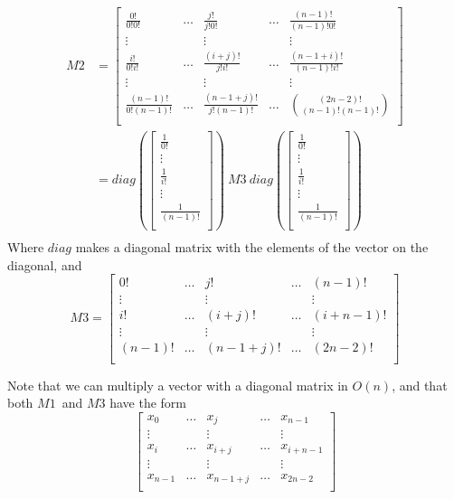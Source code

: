 \documentclass{article}
\begin{document}
\begin{align*}
M2	&= \left[\begin{array}{ccccc}
	\frac{0!}{0!0!}		&\dots	&\frac{j!}{j!0!}		&\dots	&\frac{(n-1)!}{(n-1)!0!}\\
	\vdots			&	&\vdots				&	&\vdots\\
	\frac{i!}{0!i!}		&\dots	&\frac{(i+j)!}{j!i!}		&\dots	&\frac{(n-1+i)!}{(n-1)!i!}\\
	\vdots			&	&\vdots				&	&\vdots\\
	\frac{(n-1)!}{0!(n-1)!}	&\dots	&\frac{(n-1+j)!}{j!(n-1)!}	&\dots	&\binom{(2n-2)!}{(n-1)!(n-1)!}\\
\end{array}\right]\\
	&= diag\left(\begin{bmatrix}
	\frac{1}{0!}\\
	\vdots\\
	\frac{1}{i!}\\
	\vdots\\
	\frac{1}{(n-1)!}\\
	\end{bmatrix}\right)\ M3\ diag\left(\begin{bmatrix}
	\frac{1}{0!}\\
	\vdots\\
	\frac{1}{i!}\\
	\vdots\\
	\frac{1}{(n-1)!}\\
	\end{bmatrix}\right)\\
\end{align*}
Where $diag$ makes a diagonal matrix with the elements of the vector on the diagonal, and
\begin{equation*}
M3 = \left[\begin{array}{ccccc}
	0!	&\dots	&j!		&\dots	&(n-1)!\\
	\vdots	&	&\vdots		&	&\vdots\\
	i!	&\dots	&(i+j)!		&\dots	&(i+n-1)!\\
	\vdots	&	&\vdots		&	&\vdots\\
	(n-1)!	&\dots	&(n-1+j)!	&\dots	&(2n-2)!\\
	\end{array}\right]
\end{equation*}

Note that we can multiply a vector with a diagonal matrix in $O(n)$, and that both $M1$ and $M3$ have the form
\begin{equation*}
\left[\begin{array}{ccccc}
	x_{0}	&\dots	&x_{j}		&\dots	&x_{n-1}\\
	\vdots	&	&\vdots		&	&\vdots\\
	x_{i}	&\dots	&x_{i+j}	&\dots	&x_{i+n-1}\\
	\vdots	&	&\vdots		&	&\vdots\\
	x_{n-1}	&\dots	&x_{n-1+j}	&\dots	&x_{2n-2}\\
	\end{array}\right]
\end{equation*}
\end{document}
